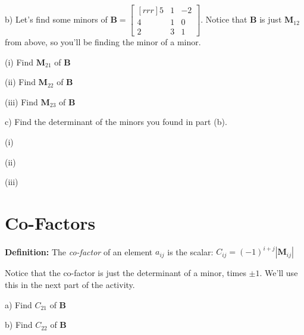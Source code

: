 \documentclass{article}
\begin{document}
\begin{flushleft}
b) Let's find some minors of $\textbf{B} =
\begin{bmatrix}[rrr]
5 & 1&-2\\
4 & 1& 0\\
2&3&1
\end{bmatrix}$.  Notice that $\textbf{B}$ is just $\textbf{M}_{12}$ from above, so you'll be finding the minor of a minor.

\vspace{0.2in}

(i) Find $\textbf{M}_{21}$ of $\textbf{B}$

\vspace{0.75in}

(ii) Find $\textbf{M}_{22}$ of $\textbf{B}$

\vspace{0.75in}

(iii) Find $\textbf{M}_{23}$ of $\textbf{B}$

\vspace{0.75in}

c) Find the determinant of the minors you found in part (b).

\vspace{0.2in}

(i)

\vspace{0.5in}

(ii)

\vspace{0.5in}

(iii)

\newpage

\section{Co-Factors}

\textbf{Definition:} The \textit{co-factor} of an element $a_{ij}$ is the scalar: $C_{ij}=(-1)^{i+j}|\textbf{M}_{ij}|$

\vspace{0.2in}

Notice that the co-factor is just the determinant of a minor, times $\pm 1$. We'll use this in the next part of the activity.

\vspace{0.2in}

a) Find $C_{21}$ of $\textbf{B}$

\vspace{0.75in}

b) Find $C_{22}$ of $\textbf{B}$


\end{flushleft}
\end{document}
